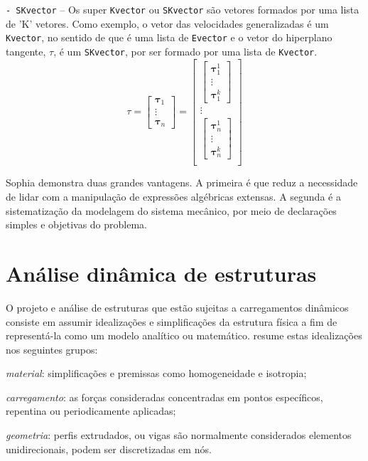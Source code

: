 \medskip \noindent
\texttt{- SKvector} -- Os super \texttt{Kvector} ou \texttt{SKvector} são
vetores formados por uma lista de 'K' vetores. Como exemplo, o vetor das
velocidades generalizadas é um \texttt{Kvector}, no sentido de que é uma lista
de \texttt{Evector} e o vetor do hiperplano tangente, $\tau$, é um
\texttt{SKvector}, por ser formado por uma lista de \texttt{Kvector}.
%
\begin{equation}
\tau = 
\begin{bmatrix}
\boldsymbol{\tau}_1\\ 
\vdots\\ 
\boldsymbol{\tau}_n
\end{bmatrix}
=
\begin{bmatrix}
\begin{bmatrix}
\boldsymbol{\tau}_1^1\\ 
\vdots\\ 
\boldsymbol{\tau}_1^k
\end{bmatrix}\\ 
\vdots\\ 
\begin{bmatrix}
\boldsymbol{\tau}_n^1\\ 
\vdots\\ 
\boldsymbol{\tau}_n^k
\end{bmatrix}\\ 
\end{bmatrix}
\end{equation}
%

Sophia demonstra duas grandes vantagens. A primeira é que reduz a necessidade de
lidar com a manipulação de expressões algébricas extensas. A segunda é a
sistematização da modelagem do sistema mecânico, por meio de declarações simples
e objetivas do problema.



\section{Análise dinâmica de estruturas}

O projeto e análise de estruturas que estão sujeitas a carregamentos dinâmicos
consiste em assumir idealizações e simplificações da estrutura física a fim de
representá-la como um modelo analítico ou matemático. \citet{paz2012structural}
resume estas idealizações nos seguintes grupos: 
%
\begin{enumerate*}[label=\emph{\alph*})]
	\item \emph{material}: simplificações e premissas como homogeneidade e
	isotropia;
	\item \emph{carregamento}: as forças consideradas concentradas em pontos
	específicos, repentina ou periodicamente aplicadas;
	\item \emph{geometria}: perfis extrudados, ou vigas são normalmente
	considerados elementos unidirecionais, podem ser discretizadas em nós.
\end{enumerate*}

